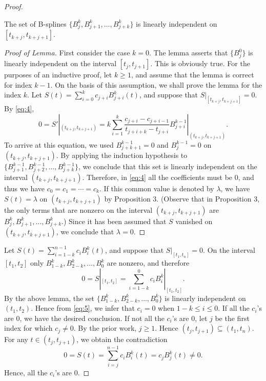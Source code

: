 \begin{sol}
\begin{proof}
    \begin{lem}
      The set of B-splines $\{B_j^k, B_{j+1}^k, \ldots, B_{j+k}^k\}$
      is linearly independent on $[t_{k+j}, t_{k+j+1}]$.
    \end{lem}
    \begin{proof}[Proof of Lemma]
      First consider the case $k=0$.
      The lemma asserts that $\{B_j^0\}$ is linearly independent
      on the interval $[t_j, t_{j+1}]$. This is obviously true.
      For the purposes of an inductive proof, let $k\ge 1$,
      and assume that the lemma is correct for index $k-1$.
      On the basis of this assumption, we shall prove the lemma
      for the index $k$.
      Let $S(t) = \sum_{i=0}^kc_{j+i}B_{j+i}^k(t)$,
      and suppose that $S|_{[t_{k+j}, t_{k+j+1}]}=0$.
      By \eqref{eq:4},
      \begin{displaymath}
        0 = S'|_{(t_{k+j}, t_{k+j+1})} = k\sum_{i=1}^k
        \frac{c_{j+i}-c_{j+i-1}}{t_{j+i+k}-t_{j+i}}B_{j+i}^{k-1}|_{(t_{k+j}, t_{k+j+1})}.
      \end{displaymath}
      To arrive at this equation,
      we used $B_{j+k+1}^{k-1}=0$ and $B_j^{k-1}=0$ on
      $(t_{k+j}, t_{k+j+1})$.
      By applying the induction hypothesis to $\{B_{j+1}^{k-1},
      B_{j+2}^{k-1}, \ldots, B_{j+k}^{k-1}\}$,
      we conclude that this set is linearly independent on the interval
      $(t_{k+j}, t_{k+j+1})$.
      Therefore, in \eqref{eq:4} all the coefficients must be $0$,
      and thus we have $c_0=c_1=\cdots=c_k$.
      If this common value is denoted by $\lambda$,
      we have $S(t) = \lambda$ on $(t_{k+j}, t_{k+j+1})$ by
      Proposition 3. (Observe that in Proposition 3,
      the only terms that are nonzero on the interval
      $(t_{k+j}, t_{k+j+1})$ are $B_j^k, B_{j+1}^k, \ldots, B_{j+k}^k$.)
      Since it has been assumed that $S$ vanished on $(t_{k+j}, t_{k+j+1})$,
      we conclude that $\lambda=0$.
    \end{proof}
    
    Let $S(t) = \sum_{i=1-k}^{n-1}c_iB_i^k(t)$,
    and suppose that $S|_{[t_1, t_n]}=0$.
    On the interval $[t_1, t_2]$ only
    $B_{1-k}^k, B_{2-k}^k, \ldots, B_0^k$ are nonzero,
    and therefore
    \begin{equation}
      \label{eq:5}
      0 = S|_{[t_1, t_2]} = \sum_{i=1-k}^0c_iB_i^k|_{[t_1, t_2]}.
    \end{equation}
    By the above lemma,
    the set $\{B_{1-k}^k, B_{2-k}^k, \ldots, B_0^k\}$
    is linearly independent on $(t_1, t_2)$.
    Hence from \eqref{eq:5},
    we infer that $c_i=0$ when $1-k\leq i\leq 0$.
    If all the $c_i$'s are $0$,
    we have the desired conclusion.
    If not all the $c_i$'s are $0$,
    let $j$ be the first index for which $c_j\neq 0$.
    By the prior work, $j\geq 1$.
    Hence $(t_j, t_{j+1})\subseteq (t_1, t_n)$.
    For any $t\in(t_j, t_{j+1})$,
    we obtain the contradiction
    \begin{displaymath}
      0 = S(t) = \sum_{i=j}^{n-1}c_iB_i^k(t) = c_jB_j^k(t) \neq 0.
    \end{displaymath}
    Hence, all the $c_i$'s are $0$.
  \end{proof}


\end{sol}
